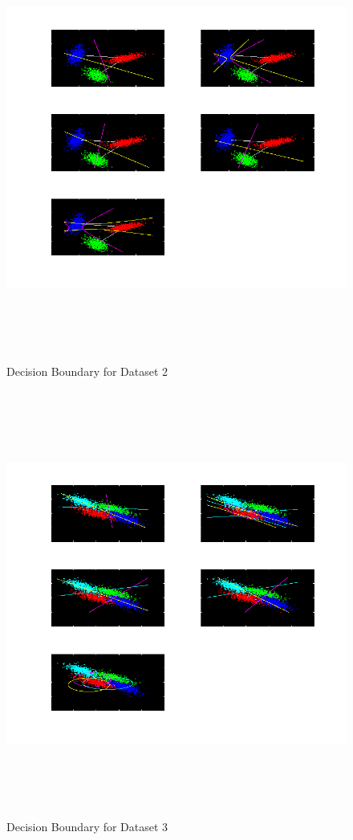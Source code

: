 \documentclass[11pt,a4paper]{article}
\begin{document}
\begin{figure}[H]
	\includegraphics[height=14cm]{Figures/NLS_DB.png}
	\caption{Decision Boundary for Dataset 2}
\end{figure}

\begin{figure}[H]
	\includegraphics[height=14cm]{Figures/OD_DB.png}
	\caption{Decision Boundary for Dataset 3}
\end{figure}
\end{document}
